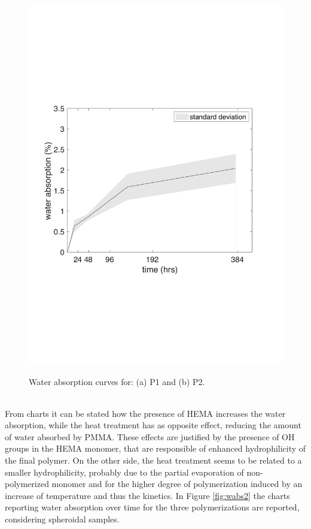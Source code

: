 \documentclass[a4paper, 11pt]{article}
\begin{document}
\begin{figure}[htp]
{\includegraphics[scale=0.35]{wabs2}}
\captionsetup{justification=centering}
\caption{Water absorption curves for: (a) P1 and (b) P2.}
\label{fig:wabs1}
\end{figure}\\
From charts it can be stated how the presence of HEMA increases the water absorption, while the heat treatment has as opposite effect, reducing the amount of water absorbed by PMMA. These effects are justified by the presence of OH groups in the HEMA monomer, that are responsible of enhanced hydrophilicity of the final polymer. On the other side, the heat treatment seems to be related to a smaller hydrophilicity, probably due to the partial evaporation of non-polymerized monomer and for the higher degree of polymerization induced by an increase of temperature and thus the kinetics. 
\newpage
In Figure \ref{fig:wabs2} the charts reporting water absorption over time for the three polymerizations are reported, considering spheroidal samples. 
\end{document}
